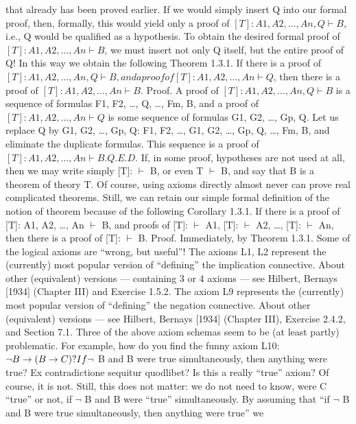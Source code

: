 that already has been proved earlier. If we would simply insert Q into our formal proof, then, formally,
this would yield only a proof of \([T]: A1, A2, \ldots , An, Q \vdash B\), i.e., Q would be qualified as a hypothesis. To
obtain the desired formal proof of \([T]: A1, A2, \ldots , An \vdash B\), we must insert not only Q itself, but the entire
proof of Q! In this way we obtain the following
Theorem 1.3.1. If there is a proof of \([T]: A1, A2, \ldots , An, Q \vdash B, and a proof of [T]: A1, A2, \ldots , An \vdash Q\),
then there is a proof of \([T]: A1, A2, \ldots , An \vdash B\).
Proof. A proof of \([T]: A1, A2, \ldots , An, Q \vdash B\) is a sequence of formulas F1, F2, \ldots , Q, \ldots , Fm, B, and a proof
of \([T]: A1, A2, \ldots , An \vdash Q\) is some sequence of formulas G1, G2, \ldots , Gp, Q. Let us replace Q by G1, G2, \ldots ,
Gp, Q:
F1, F2, \ldots , G1, G2, \ldots , Gp, Q, \ldots , Fm, B,
and eliminate the duplicate formulas. This sequence is a proof of \([T]: A1, A2, \ldots , An \vdash B. Q.E.D.\)
If, in some proof, hypotheses are not used at all, then we may write simply [T]: \(\vdash\) B, or even T \(\vdash\) B, and
say that B is a theorem of theory T. Of course, using axioms directly almost never can prove real
complicated theorems. Still, we can retain our simple formal definition of the notion of theorem because
of the following
Corollary 1.3.1. If there is a proof of [T]: A1, A2, \ldots , An \(\vdash\) B, and proofs of [T]: \(\vdash\) A1, [T]: \(\vdash\) A2, \ldots , [T]: \(\vdash\)
An, then there is a proof of [T]: \(\vdash\) B.
Proof. Immediately, by Theorem 1.3.1.
Some of the logical axioms are ``wrong, but useful''!
The axioms L1, L2 represent the (currently) most popular version of ``defining'' the implication
connective. About other (equivalent) versions --- containing 3 or 4 axioms --- see Hilbert, Bernays [1934]
(Chapter III) and Exercise 1.5.2.
The axiom L9 represents the (currently) most popular version of ``defining'' the negation connective.
About other (equivalent) versions --- see Hilbert, Bernays [1934] (Chapter III), Exercise 2.4.2, and Section
7.1.
Three of the above axiom schemas seem to be (at least partly) problematic.
For example, how do you find the funny axiom L10: \(\neg B\rightarrow (B\rightarrow C)? If \neg\) B and B were true simultaneously,
then anything were true? Ex contradictione sequitur quodlibet? Is this a really ``true'' axiom? Of course, it
is not. Still, this does not matter: we do not need to know, were C ``true'' or not, if \(\neg\) B and B were ``true''
simultaneously. By assuming that ``if \(\neg\) B and B were true simultaneously, then anything were true'' we
